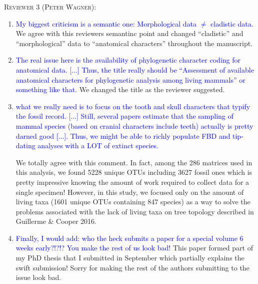 \documentclass[12pt,letterpaper]{article}
\renewcommand{\section}[1]{%
\bigskip
\begin{center}
\begin{Large}
\normalfont\scshape #1
\medskip
\end{Large}
\end{center}}
\begin{document}

\section{Reviewer 3 (Peter Wagner):}
\begin{enumerate}
\item{\textcolor{blue}{My biggest criticism is a semantic one: Morphological data $\neq$ cladistic data.}}
We agree with this reviewers semantinc point and changed ``cladistic'' and ``morphological'' data to ``anatomical characters'' throughout the manuscript.

\item{\textcolor{blue}{The real issue here is the availability of phylogenetic character coding for anatomical data.
[...] Thus, the title really should be ``Assessment of available anatomical characters for phylogenetic analysis among living mammals'' or something like that.}}
We changed the title as the reviewer suggested.

\item{\textcolor{blue}{what we really need is to focus on the tooth and skull characters that typify the fossil record.
[...] Still, several papers estimate that the sampling of mammal species (based on cranial characters include teeth) actually is pretty darned good [...].
Thus, we might be able to richly populate FBD and tip-dating analyses with a LOT of extinct species.}}

We totally agree with this comment.
In fact, among the 286 matrices used in this analysis, we found 5228 unique OTUs including 3627 fossil ones which is pretty impressive knowing the amount of work required to collect data for a single specimen!
However, in this study, we focused only on the amount of living taxa (1601 unique OTUs containing 847 species) as a way to solve the problems associated with the lack of living taxa on tree topology described in Guillerme \& Cooper 2016. 

\item{\textcolor{blue}{Finally, I would add: who the heck submits a paper for a special volume 6 weeks early?!?!? You make the rest of us look bad!}}
This paper formed part of my PhD thesis that I submitted in September which partially explains the swift submission!
Sorry for making the rest of the authors submitting to the issue look bad.

\end{enumerate}
\end{document}
